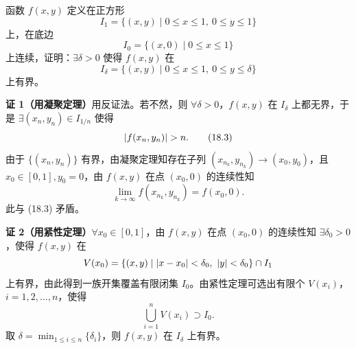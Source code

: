 \begin{xexample}[18.2.3]
函数 $f(x,y)$ 定义在正方形
\[
  I_1=\{(x,y)\mid0\le x\le1,\ 0\le y\le1\}
\]
上，在底边
\[
  I_0=\{(x,0)\mid0\le x\le1\}
\]
上连续，证明：$\exists\delta>0$ 使得 $f(x,y)$ 在
\[
  I_\delta=\{(x,y)\mid0\le x\le1,\ 0\le y\le\delta\}
\]
上有界。
\end{xexample}
\begin{xproof}
\textbf{证 1（用凝聚定理）}\quad 用反证法。若不然，则 $\forall\delta>0$，$f(x,y)$ 在 $I_\delta$ 上都无界，于是 $\exists(x_n,y_n)\in I_{1/n}$ 使得
\begin{equation}
  \lvert f(x_n,y_n)\rvert>n.
  \tag{18.3}
\end{equation}
由于 $\{(x_n,y_n)\}$ 有界，由凝聚定理知存在子列 $(x_{n_k},y_{n_k})\to(x_0,y_0)$，且 $x_0\in[0,1],y_0=0$，由 $f(x,y)$ 在点 $(x_0,0)$ 的连续性知
\[
  \lim_{k\to\infty}f(x_{n_k},y_{n_k})=f(x_0,0).
\]
此与 (18.3) 矛盾。

\textbf{证 2（用紧性定理）}\quad $\forall x_0\in[0,1]$，由 $f(x,y)$ 在点 $(x_0,0)$ 的连续性知 $\exists\delta_0>0$，使得 $f(x,y)$ 在
\[
  V(x_0)=\{(x,y)\mid\abs{x-x_0}<\delta_0,\ \abs{y}<\delta_0\}\cap I_1
\]
上有界，由此得到一族开集覆盖有限闭集 $I_0$。由紧性定理可选出有限个 $V(x_i)$，$i=1,2,\ldots,n$，使得
\[
  \bigcup_{i=1}^nV(x_i)\supset I_0.
\]
取 $\delta=\min_{1\le i\le n}\{\delta_i\}$，则 $f(x,y)$ 在 $I_\delta$ 上有界。
\end{xproof}

